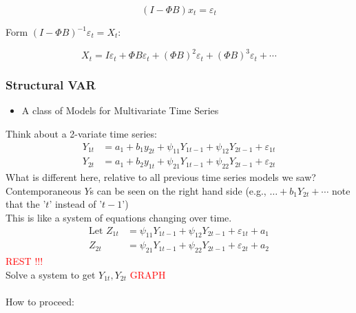 \[
(I - \Phi B) x_t = \varepsilon_t
\]

Form \((I - \Phi B)^{-1} \varepsilon_t = X_t\):

\[
X_t = I \varepsilon_t + \Phi B \varepsilon_t + (\Phi B)^2 \varepsilon_t + (\Phi B)^3 \varepsilon_t + \cdots
\]

\subsubsection{Structural VAR}
\begin{itemize}
    \item A class of Models for Multivariate Time Series 
\end{itemize}

Think about a 2-variate time series: 
\begin{align*}
    Y_{1t} &= a_1 + b_1y_{2t} + \psi_{11} Y_{1t-1} + \psi_{12} Y_{2t-1} + \varepsilon_{1t} \\
    Y_{2t} &=  a_1 + b_2 y_{1t} + \psi_{21} Y_{1t-1} + \psi_{22} Y_{2t-1} + \varepsilon_{2t}
\end{align*}
What is different here, relative to all previous time series models we saw?\\

Contemporaneous $Y$s can be seen on the right hand side (e.g., $\dots +b_1 Y_{2t}+ \cdots$ note that the '$t$' instead of '$t-1$')\\

This is like a system of equations changing over time.  
\begin{align*}
    \text{Let } Z_{1t} &= \psi_{11}Y_{1t-1}+\psi_{12}Y_{2t-1} +\varepsilon_{1t} + a_1 \\
    Z_{2t} &= \psi_{21} Y_{1t-1} + \psi_{22} Y_{2t-1} + \varepsilon_{2t} + a_2
\end{align*}
\textcolor{red}{ REST !!!}\\

Solve a system to get $Y_{1t}, Y_{2t} $
\textcolor{red}{GRAPH} \\

 \\

How to proceed: \\


